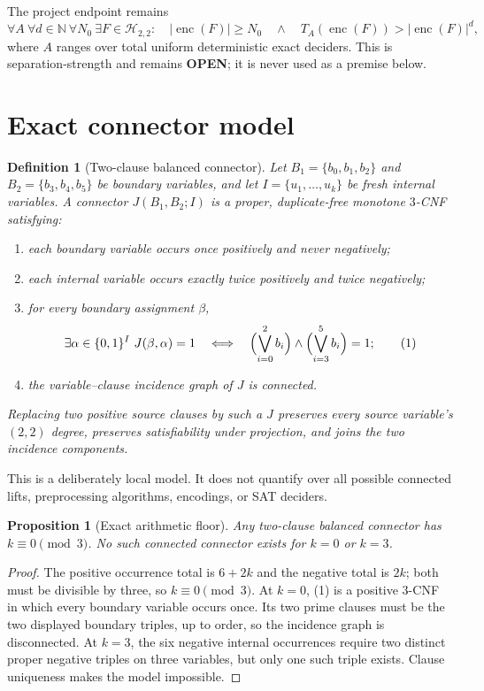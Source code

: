 \documentclass[11pt]{article}
\newtheorem{definition}{Definition}
\newtheorem{proposition}{Proposition}
\newcommand{\OPEN}{\textbf{OPEN}}
\begin{document}
The project endpoint remains
\[
\tag{UCORE-TIME1}
\forall A\ \forall d\in\mathbb N\ \forall N_0\ \exists F\in\mathcal H_{2,2}:
\quad |\operatorname{enc}(F)|\ge N_0\quad\wedge\quad
T_A(\operatorname{enc}(F))>|\operatorname{enc}(F)|^d,
\]
where $A$ ranges over total uniform deterministic exact deciders.  This is
separation-strength and remains \OPEN; it is never used as a premise below.

\section{Exact connector model}

\begin{definition}[Two-clause balanced connector]
Let $B_1=\{b_0,b_1,b_2\}$ and $B_2=\{b_3,b_4,b_5\}$ be boundary variables,
and let $I=\{u_1,\ldots,u_k\}$ be fresh internal variables.  A connector
$J(B_1,B_2;I)$ is a proper, duplicate-free monotone $3$-CNF satisfying:
\begin{enumerate}[leftmargin=*]
\item each boundary variable occurs once positively and never negatively;
\item each internal variable occurs exactly twice positively and twice
negatively;
\item for every boundary assignment $\beta$,
\[
 \exists\alpha\in\{0,1\}^{I}\ J(\beta,\alpha)=1
 \quad\Longleftrightarrow\quad
 \Bigl(\bigvee_{i=0}^{2}b_i\Bigr)\wedge
 \Bigl(\bigvee_{i=3}^{5}b_i\Bigr)=1;
\tag{1}
\]
\item the variable--clause incidence graph of $J$ is connected.
\end{enumerate}
Replacing two positive source clauses by such a $J$ preserves every source
variable's $(2,2)$ degree, preserves satisfiability under projection, and
joins the two incidence components.
\end{definition}

This is a deliberately local model.  It does not quantify over all possible
connected lifts, preprocessing algorithms, encodings, or SAT deciders.

\begin{proposition}[Exact arithmetic floor]
Any two-clause balanced connector has $k\equiv0\pmod3$.  No such connected
connector exists for $k=0$ or $k=3$.
\end{proposition}
\begin{proof}
The positive occurrence total is $6+2k$ and the negative total is $2k$;
both must be divisible by three, so $k\equiv0\pmod3$.  At $k=0$, (1) is a
positive $3$-CNF in which every boundary variable occurs once.  Its two
prime clauses must be the two displayed boundary triples, up to order, so
the incidence graph is disconnected.  At $k=3$, the six negative internal
occurrences require two distinct proper negative triples on three variables,
but only one such triple exists.  Clause uniqueness makes the model
impossible.
\end{proof}
\end{document}
